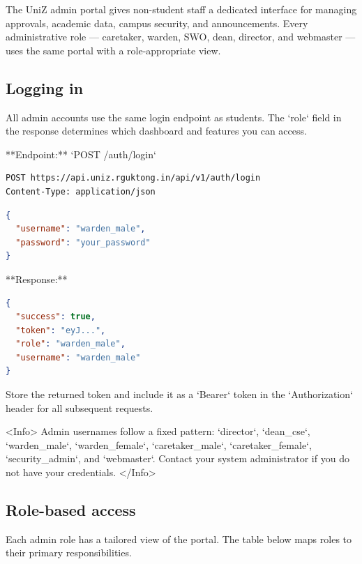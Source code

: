 


The UniZ admin portal gives non-student staff a dedicated interface for managing approvals, academic data, campus security, and announcements. Every administrative role — caretaker, warden, SWO, dean, director, and webmaster — uses the same portal with a role-appropriate view.

\subsection{Logging in}

All admin accounts use the same login endpoint as students. The `role` field in the response determines which dashboard and features you can access.

**Endpoint:** `POST /auth/login`

\begin{lstlisting}[language=bash]
POST https://api.uniz.rguktong.in/api/v1/auth/login
Content-Type: application/json

\end{lstlisting}

\begin{lstlisting}[language=json]
{
  "username": "warden_male",
  "password": "your_password"
}

\end{lstlisting}

**Response:**

\begin{lstlisting}[language=json]
{
  "success": true,
  "token": "eyJ...",
  "role": "warden_male",
  "username": "warden_male"
}

\end{lstlisting}

Store the returned token and include it as a `Bearer` token in the `Authorization` header for all subsequent requests.

<Info>
  Admin usernames follow a fixed pattern: `director`, `dean_cse`, `warden_male`,
  `warden_female`, `caretaker_male`, `caretaker_female`, `security_admin`, and
  `webmaster`. Contact your system administrator if you do not have your
  credentials.
</Info>

\subsection{Role-based access}

Each admin role has a tailored view of the portal. The table below maps roles to their primary responsibilities.

